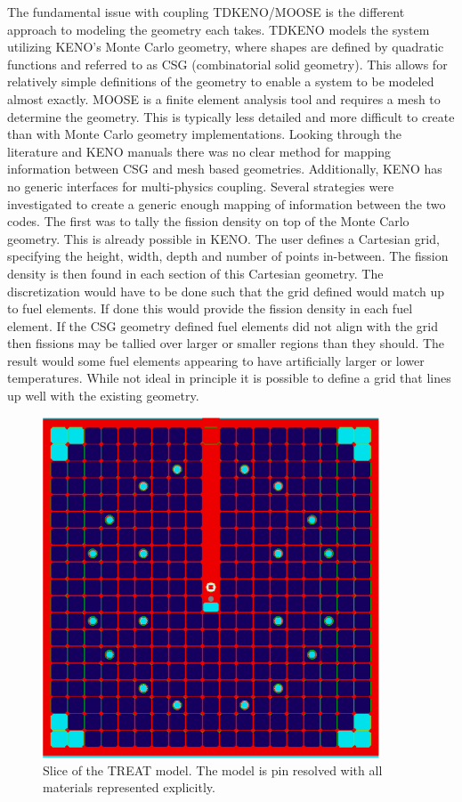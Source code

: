 \documentclass[11pt]{article}
\begin{document}
The fundamental issue with coupling TDKENO/MOOSE is the different approach to modeling the geometry each takes.  TDKENO models the system utilizing KENO's Monte Carlo geometry, where shapes are defined by quadratic functions and referred to as CSG (combinatorial solid geometry). This allows for relatively simple definitions of the geometry to enable a system to be modeled almost exactly. MOOSE is a finite element analysis tool and requires a mesh to determine the geometry.  This is typically less detailed and more difficult to create than with Monte Carlo geometry implementations.  Looking through the literature and KENO manuals there was no clear method for mapping information between CSG and mesh based geometries.  Additionally, KENO has no generic interfaces for multi-physics coupling.  Several strategies were investigated to create a generic enough mapping of information between the two codes. 
The first was to tally the fission density on top of the Monte Carlo geometry.  This is already possible in KENO.  The user defines a Cartesian grid, specifying the height, width, depth and number of points in-between.   The fission density is then found in each section of this Cartesian geometry.  The discretization would have to be done such that the grid defined would match up to fuel elements.  If done this would provide the fission density in each fuel element.  If the CSG geometry defined fuel elements did not align with the grid then fissions may be tallied over larger or smaller regions than they should.  The result would some fuel elements appearing to have artificially larger or lower temperatures.  While not ideal in principle it is possible to define a grid that lines up well with the existing geometry.  

\begin{figure}
    \centering
    \includegraphics[width=10cm]{figures/treat_top_view.png}
    \caption{Slice of the TREAT model.  The model is pin resolved with all materials represented explicitly. }
    \label{fig:treat2d}
\end{figure}
\end{document}
